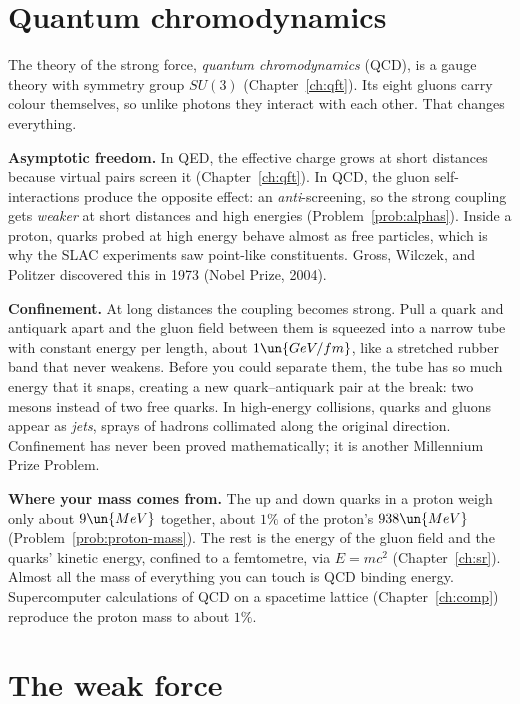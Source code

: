 \section{Quantum chromodynamics}

The theory of the strong force, \emph{quantum chromodynamics} (QCD), is a gauge theory with symmetry group $SU(3)$ (Chapter~\ref{ch:qft}). Its eight gluons carry colour themselves, so unlike photons they interact with each other. That changes everything.

\textbf{Asymptotic freedom.} In QED, the effective charge grows at short distances because virtual pairs screen it (Chapter~\ref{ch:qft}). In QCD, the gluon self-interactions produce the opposite effect: an \emph{anti}-screening, so the strong coupling gets \emph{weaker} at short distances and high energies (Problem~\ref{prob:alphas}). Inside a proton, quarks probed at high energy behave almost as free particles, which is why the SLAC experiments saw point-like constituents. Gross, Wilczek, and Politzer discovered this in 1973 (Nobel Prize, 2004).

\textbf{Confinement.} At long distances the coupling becomes strong. Pull a quark and antiquark apart and the gluon field between them is squeezed into a narrow tube with constant energy per length, about $1\un{GeV/fm}$, like a stretched rubber band that never weakens. Before you could separate them, the tube has so much energy that it snaps, creating a new quark--antiquark pair at the break: two mesons instead of two free quarks. In high-energy collisions, quarks and gluons appear as \emph{jets}, sprays of hadrons collimated along the original direction. Confinement has never been proved mathematically; it is another Millennium Prize Problem.

\textbf{Where your mass comes from.} The up and down quarks in a proton weigh only about $9\un{MeV}$ together, about $1\%$ of the proton's $938\un{MeV}$ (Problem~\ref{prob:proton-mass}). The rest is the energy of the gluon field and the quarks' kinetic energy, confined to a femtometre, via $E = mc^2$ (Chapter~\ref{ch:sr}). Almost all the mass of everything you can touch is QCD binding energy. Supercomputer calculations of QCD on a spacetime lattice (Chapter~\ref{ch:comp}) reproduce the proton mass to about $1\%$.

\section{The weak force}

